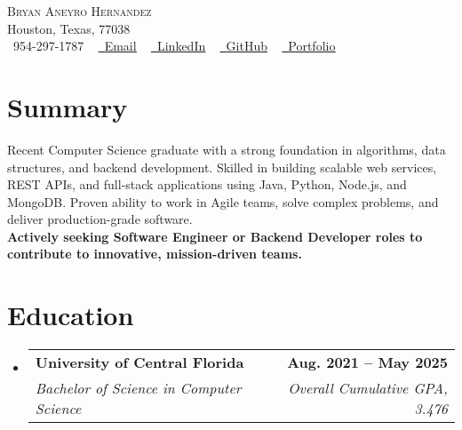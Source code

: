 \documentclass[letterpaper,11pt]{article}
\makeatletter
\newcommand{\resumeSubheading}[4]{
  \vspace{-2pt}\item
    \begin{tabular*}{1.0\textwidth}[t]{l@{\extracolsep{\fill}}r}
      \textbf{#1} & \textbf{\small #2} \\
      \textit{\small#3} & \textit{\small #4} \\
    \end{tabular*}\vspace{-7pt}
}
\newcommand{\resumeSubHeadingListStart}{\begin{itemize}[leftmargin=0.0in, label={}]}
\newcommand{\resumeSubHeadingListEnd}{\end{itemize}}
\makeatother
\begin{document}

\begin{center}
    {\Huge \scshape Bryan Aneyro Hernandez} \\ \vspace{1pt}
    Houston, Texas, 77038 \\ \vspace{1pt}
    \small \raisebox{-0.1\height}\faPhone\ 954-297-1787 ~ \href{mailto:brah0211@outlook.com}{\raisebox{-0.2\height}\faEnvelope\  \underline{Email}} ~ 
    \href{https://linkedin.com/in/bryananeyro}{\raisebox{-0.2\height}\faLinkedin\ \underline{LinkedIn}}  ~
    \href{https://github.com/Asere231}{\raisebox{-0.2\height}\faGithub\ \underline{GitHub}} ~
    \href{https://www.bitbybryan.com}{\raisebox{-0.2\height}\faGlobe\ \underline{Portfolio}}
    \vspace{-8pt}
\end{center}

\section{Summary}
\small{
Recent Computer Science graduate with a strong foundation in algorithms, data structures, and backend development. Skilled in building scalable web services, REST APIs, and full-stack applications using Java, Python, Node.js, and MongoDB. Proven ability to work in Agile teams, solve complex problems, and deliver production-grade software.\\
\textbf{Actively seeking Software Engineer or Backend Developer roles to contribute to innovative, mission-driven teams.}
}

    

\section{Education}
  \resumeSubHeadingListStart
    \resumeSubheading
      {University of Central Florida}{Aug. 2021 -- May 2025}
      {Bachelor of Science in Computer Science}{Overall Cumulative GPA, 3.476}
  \resumeSubHeadingListEnd
\end{document}

